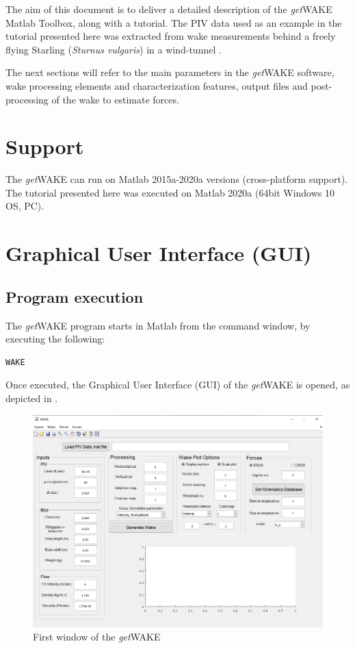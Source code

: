 \documentclass[12pt,a4paper]{article}
\begin{document}
The aim of this document is to deliver a detailed description of the \textit{get}WAKE Matlab Toolbox, along with a tutorial. The PIV data used as an example in the tutorial presented here was extracted from wake measurements behind a freely flying Starling (\textit{Sturnus vulgaris}) in a wind-tunnel \cite{Ben-Gida2013,Stalnov2015,Nafi2020}. 

The next sections will refer to the main parameters in the \textit{get}WAKE software, wake processing elements and characterization features, output files and post-processing of the wake to estimate forces. 

\section{Support}\label{Support}

The \textit{get}WAKE can run on Matlab 2015a-2020a versions (cross-platform support).
The tutorial presented here was executed on Matlab 2020a (64bit Windows 10 OS, PC).


\section{Graphical User Interface (GUI)}\label{GUI}

\subsection{Program execution}
The \textit{get}WAKE program starts in Matlab from the command window, by executing the following:

\begin{lstlisting}
WAKE
\end{lstlisting}

Once executed, the Graphical User Interface (GUI) of the \textit{get}WAKE is opened, as depicted in .

\begin{figure}[ht!]
	\centering
	\includegraphics[width=\textwidth]{open_window.png}
	\caption{First window of the \textit{get}WAKE}
	\label{fig:GUI-open_window}
\end{figure}	
\end{document}

